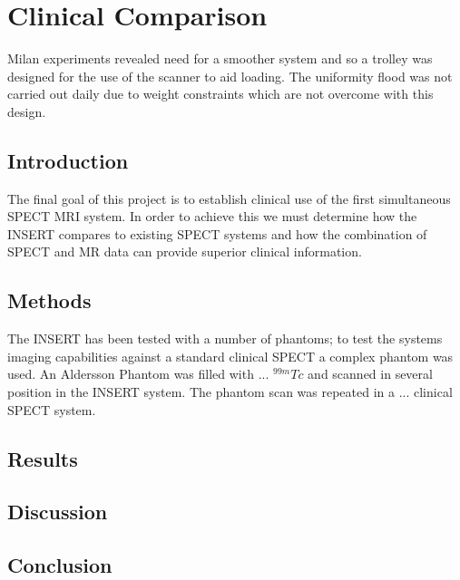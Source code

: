 \chapter{Clinical Comparison}
\label{chapterlabel}


Milan experiments revealed need for a smoother system and so a trolley was designed for the use of the scanner to aid loading. The uniformity flood was not carried out daily due to weight constraints which are not overcome with this design. 

\section{Introduction}
The final goal of this project is to establish clinical use of the first simultaneous \acrshort{SPECT} MRI system. In order to achieve this we must determine how the INSERT compares to existing SPECT systems and how the combination of SPECT and MR data can provide superior clinical information. 
\section{Methods}
The INSERT has been tested with a number of phantoms; to test the systems imaging capabilities against a standard clinical SPECT a complex phantom was used. An Aldersson Phantom was filled with ... $^{99m}Tc$ and scanned in several position in the INSERT system. The phantom scan was repeated in a ... clinical SPECT system.  
\section{Results}

\section{Discussion}

\section{Conclusion}